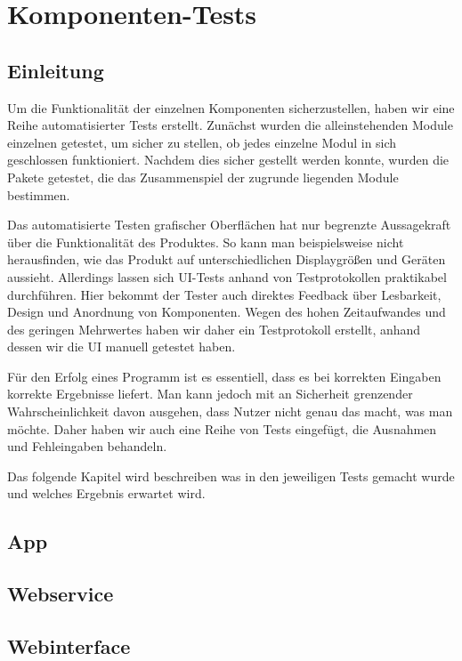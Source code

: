 \section{Komponenten-Tests}

\subsection{Einleitung}
Um die Funktionalität der einzelnen Komponenten sicherzustellen, haben wir eine Reihe automatisierter Tests erstellt. Zunächst wurden die alleinstehenden Module einzelnen getestet, um sicher zu stellen, ob jedes einzelne Modul in sich geschlossen funktioniert. Nachdem dies sicher gestellt werden konnte, wurden die Pakete getestet, die das Zusammenspiel der zugrunde liegenden Module bestimmen.\par
Das automatisierte Testen grafischer Oberflächen hat nur begrenzte Aussagekraft über die Funktionalität des Produktes. So kann man beispielsweise nicht herausfinden, wie das Produkt auf unterschiedlichen Displaygrößen und Geräten aussieht. Allerdings lassen sich UI-Tests anhand von Testprotokollen praktikabel durchführen. Hier bekommt der Tester auch direktes Feedback über Lesbarkeit, Design und Anordnung von Komponenten. Wegen des hohen Zeitaufwandes und des geringen Mehrwertes haben wir daher ein Testprotokoll erstellt, anhand dessen wir die UI manuell getestet haben.\par
Für den Erfolg eines Programm ist es essentiell, dass es bei korrekten Eingaben korrekte Ergebnisse liefert. Man kann jedoch mit an Sicherheit grenzender Wahrscheinlichkeit davon ausgehen, dass Nutzer nicht genau das macht, was man möchte. Daher haben wir auch eine Reihe von Tests eingefügt, die Ausnahmen und Fehleingaben behandeln.\par
Das folgende Kapitel wird beschreiben was in den jeweiligen Tests gemacht wurde und welches Ergebnis erwartet wird.

\newpage
\subsection{App}

\newpage
\subsection{Webservice}

\newpage
\subsection{Webinterface}

